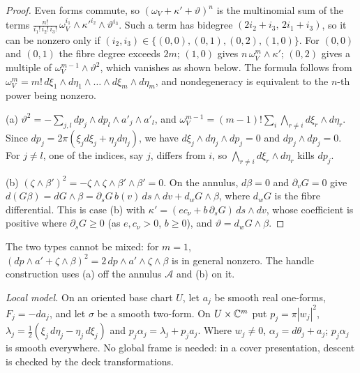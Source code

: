 \begin{proof}
Even forms commute, so $(\omega_V+\kappa'+\vartheta)^n$ is the multinomial sum of the terms $\frac{n!}{i_1!\,i_2!\,i_3!}\,\omega_V^{i_1}\wedge\kappa'^{i_2}\wedge\vartheta^{i_3}$. Such a term has bidegree $(2i_2+i_3,\,2i_1+i_3)$, so it can be nonzero only if $(i_2,i_3)\in\{(0,0),(0,1),(0,2),(1,0)\}$. For $(0,0)$ and $(0,1)$ the fibre degree exceeds $2m$; $(1,0)$ gives $n\,\omega_V^m\wedge\kappa'$; $(0,2)$ gives a multiple of $\omega_V^{m-1}\wedge\vartheta^2$, which vanishes as shown below. The formula follows from $\omega_V^m=m!\,d\xi_1\wedge d\eta_1\wedge\dots\wedge d\xi_m\wedge d\eta_m$, and nondegeneracy is equivalent to the $n$-th power being nonzero.

(a) $\vartheta^2=-\sum_{j,l}dp_j\wedge dp_l\wedge a'_j\wedge a'_l$, and $\omega_V^{m-1}=(m-1)!\sum_i\bigwedge_{r\ne i}d\xi_r\wedge d\eta_r$. Since $dp_j=2\pi(\xi_jd\xi_j+\eta_jd\eta_j)$, we have $d\xi_j\wedge d\eta_j\wedge dp_j=0$ and $dp_j\wedge dp_j=0$. For $j\ne l$, one of the indices, say $j$, differs from $i$, so $\bigwedge_{r\ne i}d\xi_r\wedge d\eta_r$ kills $dp_j$.

(b) $(\zeta\wedge\beta')^2=-\zeta\wedge\zeta\wedge\beta'\wedge\beta'=0$. On the annulus, $d\beta=0$ and $\partial_vG=0$ give $d(G\beta)=dG\wedge\beta=\partial_sG\,b(v)\,ds\wedge dv+d_wG\wedge\beta$, where $d_wG$ is the fibre differential. This is case (b) with $\kappa'=(ec_\nu+b\,\partial_sG)\,ds\wedge dv$, whose coefficient is positive where $\partial_sG\ge0$ (as $e,c_\nu>0$, $b\ge0$), and $\vartheta=d_wG\wedge\beta$.
\end{proof}

The two types cannot be mixed: for $m=1$, $(dp\wedge a'+\zeta\wedge\beta)^2=2\,dp\wedge a'\wedge\zeta\wedge\beta$ is in general nonzero. The handle construction uses (a) off the annulus $\mathcal A$ and (b) on it.

\emph{Local model.} On an oriented base chart $U$, let $a_j$ be smooth real one-forms, $F_j=-da_j$, and let $\sigma$ be a smooth two-form. On $U\times\mathbb{C}^m$ put $p_j=\pi|w_j|^2$, $\lambda_j=\tfrac12(\xi_j\,d\eta_j-\eta_j\,d\xi_j)$ and $p_j\alpha_j=\lambda_j+p_ja_j$. Where $w_j\ne0$, $\alpha_j=d\theta_j+a_j$; $p_j\alpha_j$ is smooth everywhere. No global frame is needed: in a cover presentation, descent is checked by the deck transformations.

